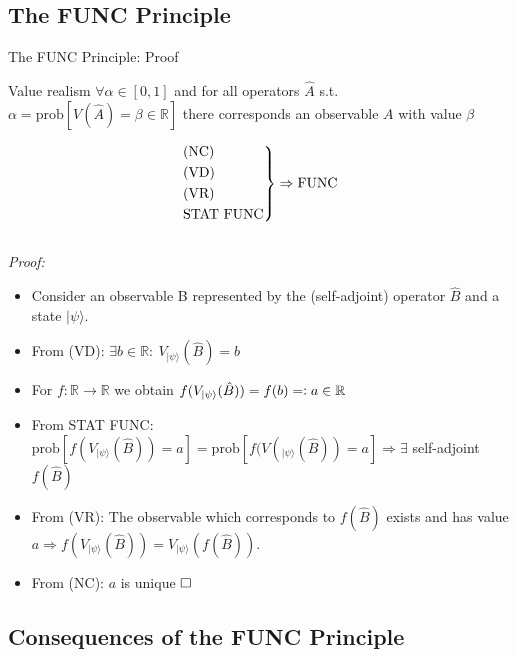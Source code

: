 \documentclass{beamer}
\newcommand{\eqdef}{=\vcentcolon}
\newcommand{\R}{\mathbb{R}}
\begin{document}
\subsection{The FUNC Principle}
\begin{frame}[allowframebreaks]{The FUNC Principle: Proof}
\begin{block}{Value realism}
$\forall \alpha\in[0,1]$ and for all operators $\hat A$ s.t. $\alpha =\mathrm{prob}\left[V(\hat A)=\beta\in\R \right]$ there corresponds an observable $A$ with value $\beta$
\end{block}
$$
\begin{rcases}
\mathrm{(NC)}\\
\mathrm{(VD)}\\
\mathrm{(VR)}\\
\mathrm{STAT\ FUNC}
\end{rcases}\Rightarrow \mathrm{FUNC}
$$
\\
\framebreak
\textit{Proof:}\\
\begin{itemize}
\item Consider an observable B represented by the (self-adjoint) operator $\hat B$ and a state $|\psi\rangle$.
\item From (VD): $\exists b\in\R:\ V_{|\psi\rangle}(\hat B)=b$
\item For $f:\R\rightarrow\R$ we obtain $f(V_{|\psi\rangle}(\hat B))=f(b)\eqdef a\in\R$
\item From STAT FUNC: $\mathrm{prob}\left[f(V_{|\psi\rangle}(\hat B))=a\right]=\mathrm{prob}\left[f(V(_{|\psi\rangle}(\hat B))=a\right] \Rightarrow\exists$ self-adjoint $f(\hat B)$
\item From (VR): The observable which corresponds to $f(\hat B)$ exists and has value $a\Rightarrow f(V_{|\psi\rangle}(\hat B))=V_{|\psi\rangle}(f(\hat B))$. 
\item From (NC): $a$ is unique $\hfill\square$
\end{itemize}




\end{frame}



\subsection{Consequences of the FUNC Principle}
\end{document}
